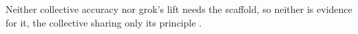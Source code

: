 Neither collective accuracy nor grok's lift needs the scaffold, so neither
is evidence for it, the collective sharing only its principle
\citep{longino1990science}.
